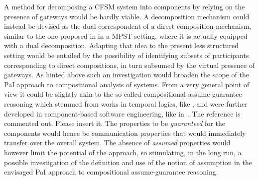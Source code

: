 A method for decomposing a CFSM system into components by relying on the presence of gateways
would be hardly viable. A decomposition mechanism could instead be devised as the dual
correspondent of a direct composition mechanism, similar to the one proposed in \cite{BDLT21}
in a MPST setting, where it is actually equipped with a dual decomposition.
Adapting that idea to the present less structured setting would be entailed by the possibility of 
identifying subsets of participants corresponding to direct compositions,
in turn subsumed by the virtual presence of gateways.
As hinted above such an investigation would broaden the scope of the PaI approach to  
compositional analysis of systems. From a very general point of view it could be slightly akin to 
the so called compositional assume-guarantee reasoning which stemmed from works in temporal logics, like \cite{Pnueli84}, and were further developed in component-based software engineering, like in~\cite{}.
\brc The reference is commented out. Please insert it.
\erc
The properties to be {\em guaranteed} for the components would hence be communication properties that would immediately transfer over the overall system.
The absence of {\em assumed} properties would however limit the potential of the approach,
so stimulating, in the long run, a possible investigation of the definition and use  of the notion
of assumption in the envisaged PaI approach to compositional assume-guarantee reasoning.
\efr   
  

